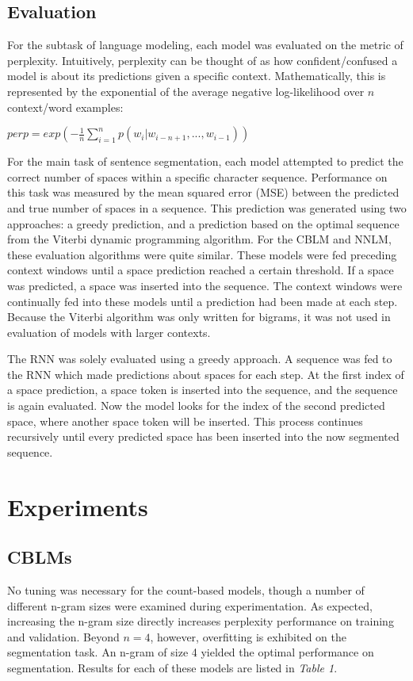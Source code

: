 \documentclass[11pt]{article}
\begin{document}
\subsection{Evaluation}
For the subtask of language modeling, each model was evaluated on the metric of perplexity. Intuitively, perplexity can be thought of as how confident/confused a model is about its predictions given a specific context. Mathematically, this is represented by the exponential of the average negative log-likelihood over $n$ context/word examples:
\begin{center}
    $perp = exp(-\frac{1}{n}\sum_{i=1}^{n} p(w_{\scriptscriptstyle i}|w_{\scriptscriptstyle i-n+1},...,w_{\scriptscriptstyle i-1}))$
\end{center}
For the main task of sentence segmentation, each model attempted to predict the correct number of spaces within a specific character sequence. Performance on this task was measured by the mean squared error (MSE) between the predicted and true number of spaces in a sequence. This prediction was generated using two approaches: a greedy prediction, and a prediction based on the optimal sequence from the Viterbi dynamic programming algorithm. For the CBLM and NNLM, these evaluation algorithms were quite similar. These models were fed preceding context windows until a space prediction reached a certain threshold. If a space was predicted, a space was inserted into the sequence. The context windows were continually fed into these models until a prediction had been made at each step. Because the Viterbi algorithm was only written for bigrams, it was not used in evaluation of models with larger contexts.

The RNN was solely evaluated using a greedy approach. A sequence was fed to the RNN which made predictions about spaces for each step. At the first index of a space prediction, a space token is inserted into the sequence, and the sequence is again evaluated. Now the model looks for the index of the second predicted space, where another space token will be inserted. This process continues recursively until every predicted space has been inserted into the now segmented sequence.

\section{Experiments}

\subsection{CBLMs}
No tuning was necessary for the count-based models, though a number of different n-gram sizes were examined during experimentation. As expected, increasing the n-gram size directly increases perplexity performance on training and validation. Beyond $n=4$, however, overfitting is exhibited on the segmentation task. An n-gram of size 4 yielded the optimal performance on segmentation. Results for each of these models are listed in \textit{Table 1}.
\end{document}
